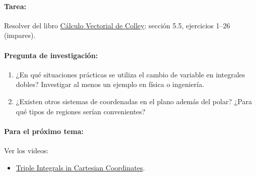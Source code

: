 \documentclass[a4,11pt]{aleph-notas}
\begin{document}
\paragraph{Tarea:}
Resolver del libro \href{https://catalogobiblioteca.puce.edu.ec/cgi-bin/koha/opac-detail.pl?biblionumber=83405&query_desc=su%3A%22An%C3%A1lisis%20vectorial%22}{Cálculo Vectorial de Colley}: sección 5.5, ejercicios 1--26 (impares).

\paragraph{Pregunta de investigación:}
\begin{enumerate}[leftmargin=*]
    \item ¿En qué situaciones prácticas se utiliza el cambio de variable en integrales dobles? Investigar al menos un ejemplo en física o ingeniería.
    \item ¿Existen otros sistemas de coordenadas en el plano además del polar? ¿Para qué tipos de regiones serían convenientes?
\end{enumerate}

\paragraph{Para el próximo tema:}
Ver los videos:
\begin{itemize}[leftmargin=*]
    \item \href{https://youtu.be/ZIn1rgZVPFw?si=07QWx6a579WPnGmE}{Triple Integrals in Cartesian Coordinates}.
\end{itemize}
\end{document}
